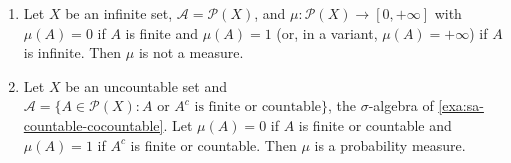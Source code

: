 \begin{example}\label{exa:ms-two-set-functions}
\leavevmode
\begin{enumerate}[label=\arabic*)]
  \item Let $X$ be an infinite set, $\mathcal A=\mathcal P(X)$, and
    $\mu:\mathcal P(X)\to[0,+\infty]$ with $\mu(A)=0$ if $A$ is finite and $\mu(A)=1$ (or, in a
    variant, $\mu(A)=+\infty$) if $A$ is infinite. Then $\mu$ is not a measure.
  \item Let $X$ be an uncountable set and
    $\mathcal A=\{A\in\mathcal P(X):A\text{ or }A^c\text{ is finite or countable}\}$, the
    $\sigma$-algebra of \cref{exa:sa-countable-cocountable}. Let $\mu(A)=0$ if $A$ is finite or
    countable and $\mu(A)=1$ if $A^c$ is finite or countable. Then $\mu$ is a probability
    measure.
\end{enumerate}
\end{example}

